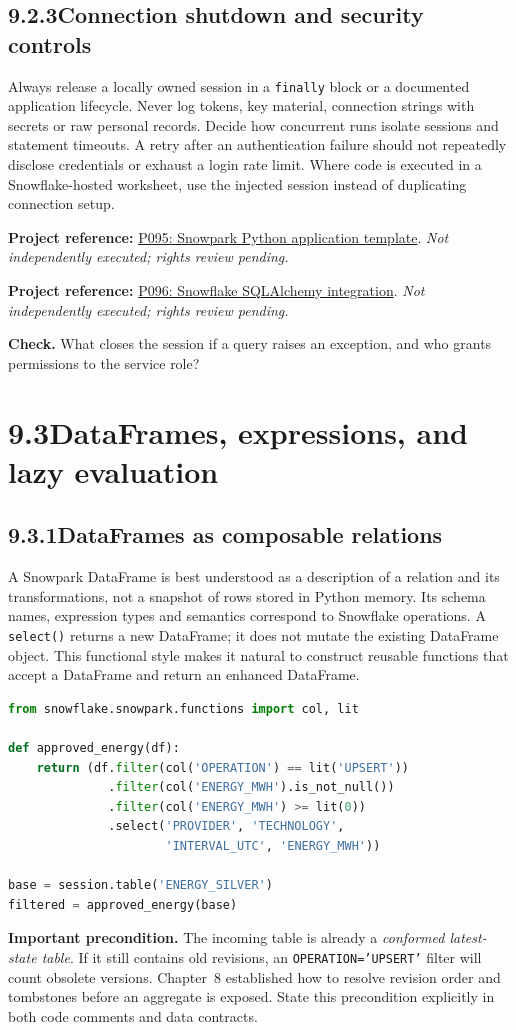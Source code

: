 \documentclass[11pt,twoside]{article}
\newcommand{\topic}[2]{\subsection*{#1\quad #2}}
\newcommand{\repo}[2]{\par\begingroup\fontsize{8.0}{9.6}\selectfont\sffamily\color{inkgray}\textbf{Project reference:} \href{#2}{#1}. \textit{Not independently executed; rights review pending.}\par\endgroup}
\begin{document}
\topic{9.2.3}{Connection shutdown and security controls}
Always release a locally owned session in a \texttt{finally} block or a documented application lifecycle. Never log tokens, key material, connection strings with secrets or raw personal records. Decide how concurrent runs isolate sessions and statement timeouts. A retry after an authentication failure should not repeatedly disclose credentials or exhaust a login rate limit. Where code is executed in a Snowflake-hosted worksheet, use the injected session instead of duplicating connection setup.
\repo{P095: Snowpark Python application template}{https://github.com/Snowflake-Labs/snowpark-python-template}
\repo{P096: Snowflake SQLAlchemy integration}{https://github.com/snowflakedb/snowflake-sqlalchemy}
\textbf{Check.} What closes the session if a query raises an exception, and who grants permissions to the service role?
\newpage
\section*{9.3\quad DataFrames, expressions, and lazy evaluation}
\topic{9.3.1}{DataFrames as composable relations}
A Snowpark DataFrame is best understood as a description of a relation and its transformations, not a snapshot of rows stored in Python memory. Its schema names, expression types and semantics correspond to Snowflake operations. A \texttt{select()} returns a new DataFrame; it does not mutate the existing DataFrame object. This functional style makes it natural to construct reusable functions that accept a DataFrame and return an enhanced DataFrame.
\begin{lstlisting}[language=Python,caption={Composable transformations: no output action yet.}]
from snowflake.snowpark.functions import col, lit

def approved_energy(df):
    return (df.filter(col('OPERATION') == lit('UPSERT'))
              .filter(col('ENERGY_MWH').is_not_null())
              .filter(col('ENERGY_MWH') >= lit(0))
              .select('PROVIDER', 'TECHNOLOGY',
                      'INTERVAL_UTC', 'ENERGY_MWH'))

base = session.table('ENERGY_SILVER')
filtered = approved_energy(base)
\end{lstlisting}
\textbf{Important precondition.} The incoming table is already a \emph{conformed latest-state table}. If it still contains old revisions, an \texttt{OPERATION='UPSERT'} filter will count obsolete versions. Chapter~8 established how to resolve revision order and tombstones before an aggregate is exposed. State this precondition explicitly in both code comments and data contracts.
\end{document}
